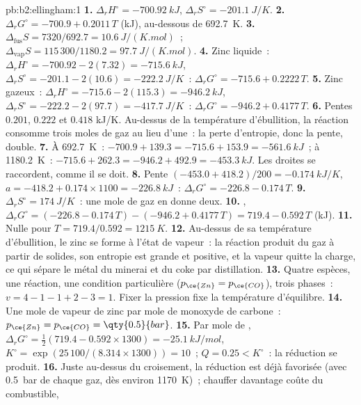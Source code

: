 \begin{solution}{pb:b2:ellingham:1}
\textbf{1.} $\Delta_r H^\circ = \qty{-700.92}{kJ}$, $\Delta_r S^\circ =
\qty{-201.1}{J/K}$.
\textbf{2.} $\Delta_r G^\circ = -700.9 + 0.2011\,T$ (\unit{kJ}), au-dessous de
\qty{692.7}{K}.
\textbf{3.} $\Delta_{\text{fus}}S = 7320/692.7 = \qty{10.6}{J/(K.mol)}$~;
$\Delta_{\text{vap}}S = 115\,300/1180.2 = \qty{97.7}{J/(K.mol)}$.
\textbf{4.} Zinc liquide~: $\Delta_r H^\circ = -700.92 - 2(7.32) = \qty{-715.6}{kJ}$,
$\Delta_r S^\circ = -201.1 - 2(10.6) = \qty{-222.2}{J/K}$~: $\Delta_r G^\circ =
-715.6 + 0.2222\,T$.
\textbf{5.} Zinc gazeux~: $\Delta_r H^\circ = -715.6 - 2(115.3) = \qty{-946.2}{kJ}$,
$\Delta_r S^\circ = -222.2 - 2(97.7) = \qty{-417.7}{J/K}$~: $\Delta_r G^\circ =
-946.2 + 0.4177\,T$.
\textbf{6.} Pentes $0.201$, $0.222$ et $0.418$ \unit{kJ/K}. Au-dessus de la température
d'ébullition, la réaction consomme trois moles de gaz au lieu d'une~: la perte
d'entropie, donc la pente, double.
\textbf{7.} À \qty{692.7}{K}~: $-700.9 + 139.3 = -715.6 + 153.9 = \qty{-561.6}{kJ}$~;
à \qty{1180.2}{K}~: $-715.6 + 262.3 = -946.2 + 492.9 = \qty{-453.3}{kJ}$. Les
droites se raccordent, comme il se doit.
\textbf{8.} Pente $(-453.0 + 418.2)/200 = \qty{-0.174}{kJ/K}$, $a = -418.2 +
0.174 \times 1100 = \qty{-226.8}{kJ}$~: $\Delta_r G^\circ = -226.8 - 0.174\,T$.
\textbf{9.} $\Delta_r S^\circ = \qty{+174}{J/K}$~: une mole de gaz en donne deux.
\textbf{10.} , $\Delta_r G^\circ = (-226.8 - 0.174\,T)
- (-946.2 + 0.4177\,T) = 719.4 - 0.592\,T$ (\unit{kJ}).
\textbf{11.} Nulle pour $T = 719.4/0.592 = \qty{1215}{K}$.
\textbf{12.} Au-dessus de sa température d'ébullition, le zinc se forme à l'état de vapeur~: la réaction produit
du gaz à partir de solides, son entropie est grande et positive, et la vapeur quitte la
charge, ce qui sépare le métal du minerai et du coke par distillation.
\textbf{13.} Quatre espèces, une réaction, une condition particulière ($p_{\ce{Zn}} =
p_{\ce{CO}}$), trois phases~: $v = 4 - 1 - 1 + 2 - 3 = 1$. Fixer la pression
fixe la température d'équilibre.
\textbf{14.} Une mole de vapeur de zinc par mole de monoxyde de carbone~:
$p_{\ce{Zn}} = p_{\ce{CO}} = \qty{0.5}{bar}$.
\textbf{15.} Par mole de , $\Delta_r G^\circ = \frac12(719.4 - 0.592 \times
1300) = \qty{-25.1}{kJ/mol}$, $K^\circ = \exp(25\,100/(8.314 \times 1300)) = 10$~;
$Q = 0.25 < K^\circ$~: la réduction se produit.
\textbf{16.} Juste au-dessus du croisement, la réduction est déjà favorisée (avec
\qty{0.5}{bar} de chaque gaz, dès environ \qty{1170}{K})~; chauffer davantage coûte du combustible,

\end{solution}
